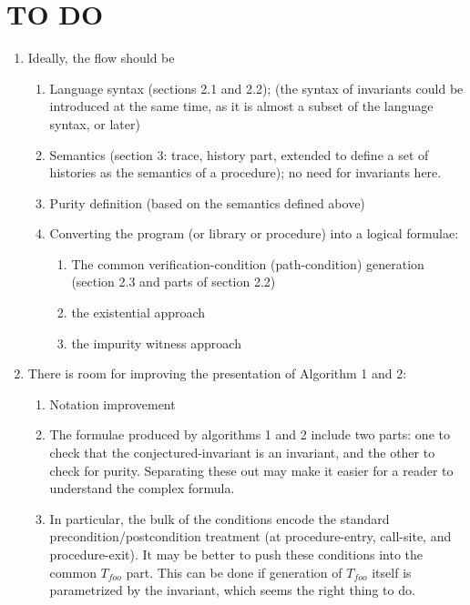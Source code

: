 \section*{TO DO}

\begin{enumerate}

\item Ideally, the flow should be
\begin{enumerate}
\item Language syntax (sections 2.1 and 2.2); (the syntax of invariants could be
introduced at the same time, as it is almost a subset of the language syntax, or later)

\item Semantics (section 3: trace, history part, extended to define a set of histories
as the semantics of a procedure); no need for invariants here.

\item Purity definition (based on the semantics defined above)

\item Converting the program (or library or procedure) into a logical formulae:
\begin{enumerate}
\item The common verification-condition (path-condition) generation (section 2.3
and parts of section 2.2)
\item the existential approach
\item the impurity witness approach
\end{enumerate}

\end{enumerate}


\item There is room for improving the presentation of Algorithm 1 and 2:
\begin{enumerate}
\item Notation improvement
\item The formulae produced by algorithms 1 and 2 include two parts:
one to check that the conjectured-invariant is an invariant, and the
other to check for purity. Separating these out may make it easier for
a reader to understand the complex formula.
\item In particular, the bulk of the conditions encode the standard
precondition/postcondition treatment (at procedure-entry, call-site,
and procedure-exit). It may be better to push these conditions into
the common $T_{foo}$ part. This can be done if generation of $T_{foo}$
itself is parametrized by the invariant, which seems the right thing to do.
\end{enumerate}

\end{enumerate}